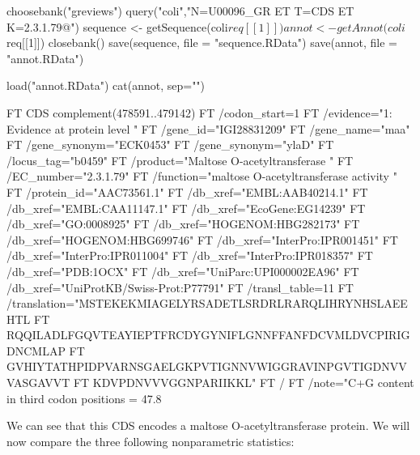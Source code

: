 \documentclass{article}
\begin{document}
\begin{Schunk}
\begin{Sinput}
 choosebank("greviews")
 query("coli","N=U00096_GR ET T=CDS ET K=2.3.1.79@")
 sequence <- getSequence(coli$req[[1]])
 annot <- getAnnot(coli$req[[1]])
 closebank()
 save(sequence, file = "sequence.RData")
 save(annot, file = "annot.RData")
\end{Sinput}
\end{Schunk}
\begin{Schunk}
\begin{Sinput}
 load("annot.RData")
 cat(annot, sep="\n")
\end{Sinput}
\begin{Soutput}
FT   CDS             complement(478591..479142)
FT                   /codon_start=1
FT                   /evidence="1: Evidence at protein level "
FT                   /gene_id="IGI28831209"
FT                   /gene_name="maa"
FT                   /gene_synonym="ECK0453"
FT                   /gene_synonym="ylaD"
FT                   /locus_tag="b0459"
FT                   /product="Maltose O-acetyltransferase "
FT                   /EC_number="2.3.1.79"
FT                   /function="maltose O-acetyltransferase activity "
FT                   /protein_id="AAC73561.1"
FT                   /db_xref="EMBL:AAB40214.1"
FT                   /db_xref="EMBL:CAA11147.1"
FT                   /db_xref="EcoGene:EG14239"
FT                   /db_xref="GO:0008925"
FT                   /db_xref="HOGENOM:HBG282173"
FT                   /db_xref="HOGENOM:HBG699746"
FT                   /db_xref="InterPro:IPR001451"
FT                   /db_xref="InterPro:IPR011004"
FT                   /db_xref="InterPro:IPR018357"
FT                   /db_xref="PDB:1OCX"
FT                   /db_xref="UniParc:UPI000002EA96"
FT                   /db_xref="UniProtKB/Swiss-Prot:P77791"
FT                   /transl_table=11
FT                   /translation="MSTEKEKMIAGELYRSADETLSRDRLRARQLIHRYNHSLAEEHTL
FT                   RQQILADLFGQVTEAYIEPTFRCDYGYNIFLGNNFFANFDCVMLDVCPIRIGDNCMLAP
FT                   GVHIYTATHPIDPVARNSGAELGKPVTIGNNVWIGGRAVINPGVTIGDNVVVASGAVVT
FT                   KDVPDNVVVGGNPARIIKKL"
FT                   /%
FT                   /note="C+G content in third codon positions = 47.8 %
\end{Soutput}
\end{Schunk}

We can see
that this CDS encodes a maltose O-acetyltransferase protein. 
We will now compare the three
following nonparametric statistics:
\end{document}

